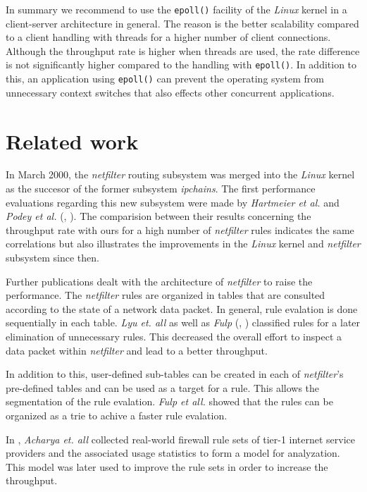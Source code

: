 \documentclass{sig-alternate}
\begin{document}
In summary we recommend to use the \texttt{epoll()} facility of the \emph{Linux}
kernel in a client-server architecture in general. The reason is the better 
scalability compared to a client hand\-ling with threads for a higher number of 
client connections. Although the throughput rate is higher when threads are 
used, the rate difference is not significantly higher compared to the 
hand\-ling with \texttt{epoll()}. In addition to this, an application using 
\texttt{epoll()} can prevent the operating system from unnecessary context 
switches that also effects other concurrent applications.

\section{Related work}
\noindent In March 2000, the \emph{netfilter} routing subsystem was mer\-ged 
into the \emph{Linux} kernel as the succesor of the former subsystem 
\emph{ipchains}. The first performance evaluations regarding this new subsystem 
were made by \emph{Hartmeier et al.} and \emph{Podey et al.} 
(\cite{hartmeier2002design}, \cite{podey2003network}). The comparision 
bet\-ween their results concerning the throughput rate with ours for a high 
number of \emph{netfilter} rules indicates the same correlations but also 
illustrates the improvements in the \emph{Linux} kernel and \emph{netfilter} 
subsystem since then.

Further publications dealt with the architecture of \emph{netfilter} to raise 
the performance. The \emph{netfilter} rules are organized in tables that are 
consulted according to the state of a network data packet. In general, rule 
evalation is done sequentially in each table. \emph{Lyu et. all} as well as 
\emph{Fulp} (\cite{lyu2000firewall}, \cite{fulp2005optimization}) classified 
rules for a later elimination of unnecessary rules. This decreased the overall 
effort to inspect a data packet within \emph{netfilter} and lead to a better 
throughput.

In addition to this, user-defined sub-tables can be crea\-ted in each of 
\emph{netfilter}'s pre-defined tables and can be used as a target for a rule. 
This allows the segmentation of the rule evalation. \emph{Fulp et all.} 
\cite{fulp2005optimization} showed that the rules can be organized as a trie to 
achive a faster rule evalation.

In \cite{acharya2006simulation}, \emph{Acharya et. all} collected real-world 
firewall rule sets of tier-1 internet service providers and the associated 
usage statistics to form a model for analyzation. This model was later used to 
improve the rule sets in order to increase the throughput.
\end{document}
